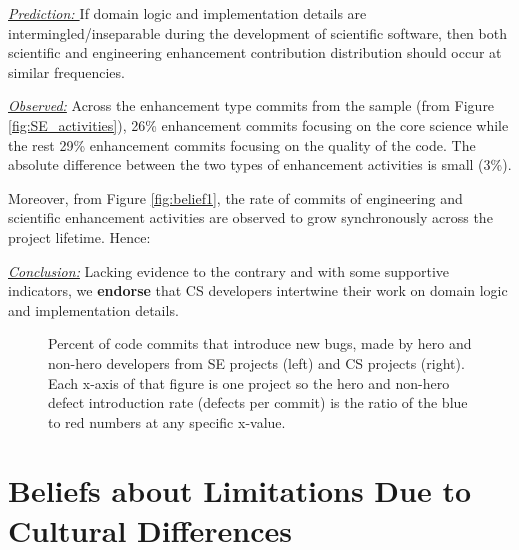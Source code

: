 \documentclass[sigconf]{acmart}
\newenvironment{RQ}{\vspace{1mm}\begin{tcolorbox}[enhanced,width=3.4in,size=fbox,colback=red!5!white,drop shadow southeast,sharp corners]}{\end{tcolorbox}}
\begin{document}
\noindent \textit{\underline{Prediction: }} If domain logic and implementation details are intermingled/inseparable during the development of scientific software, then both scientific and engineering enhancement contribution distribution should occur at similar frequencies.

\noindent \textit{\underline{Observed:}} Across the enhancement type commits from the sample (from Figure \ref{fig:SE_activities}), 26\% enhancement commits focusing on the core science while the rest 29\% enhancement commits focusing on the quality of the code. The absolute difference between the two types of enhancement activities is small (3\%). 

Moreover, from Figure \ref{fig:belief1}, the rate of commits of engineering and scientific enhancement activities are observed to grow synchronously across the project lifetime. Hence:

\begin{RQ}
\textit{\underline{Conclusion:}} Lacking evidence to the contrary and with some supportive indicators, 
we \textbf{endorse}  that CS developers intertwine their work
on domain logic and implementation details.
\end{RQ}




\begin{figure}[!t]

\caption{Percent of code commits that introduce new bugs, made by hero and non-hero developers from  SE projects (left) and CS projects (right).
Each x-axis of that figure is one project so the hero and non-hero defect introduction rate (defects per commit) is the ratio of the blue to red numbers
at any specific x-value.
}\label{fig:heroes}
\end{figure}

\section{Beliefs about Limitations Due to Cultural Differences}
\end{document}
